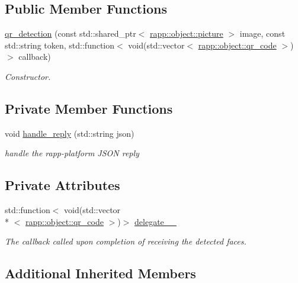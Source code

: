\subsection*{Public Member Functions}
\begin{DoxyCompactItemize}
\item 
\hyperlink{classrapp_1_1cloud_1_1qr__detection_a6006885dc4ef44b2352b52b57c884ae3}{qr\-\_\-detection} (const std\-::shared\-\_\-ptr$<$ \hyperlink{classrapp_1_1object_1_1picture}{rapp\-::object\-::picture} $>$ image, const std\-::string token, std\-::function$<$ void(std\-::vector$<$ \hyperlink{classrapp_1_1object_1_1qr__code}{rapp\-::object\-::qr\-\_\-code} $>$)$>$ callback)
\begin{DoxyCompactList}\small\item\em Constructor. \end{DoxyCompactList}\end{DoxyCompactItemize}
\subsection*{Private Member Functions}
\begin{DoxyCompactItemize}
\item 
void \hyperlink{classrapp_1_1cloud_1_1qr__detection_a1f3bba0cec4db62f9b88388eb9c89867}{handle\-\_\-reply} (std\-::string json)
\begin{DoxyCompactList}\small\item\em handle the rapp-\/platform J\-S\-O\-N reply \end{DoxyCompactList}\end{DoxyCompactItemize}
\subsection*{Private Attributes}
\begin{DoxyCompactItemize}
\item 
std\-::function$<$ void(std\-::vector\\*
$<$ \hyperlink{classrapp_1_1object_1_1qr__code}{rapp\-::object\-::qr\-\_\-code} $>$)$>$ \hyperlink{classrapp_1_1cloud_1_1qr__detection_a02c037ac6a2ab8f29bb50a5ff27cd4bf}{delegate\-\_\-\-\_\-}
\begin{DoxyCompactList}\small\item\em The callback called upon completion of receiving the detected faces. \end{DoxyCompactList}\end{DoxyCompactItemize}
\subsection*{Additional Inherited Members}


